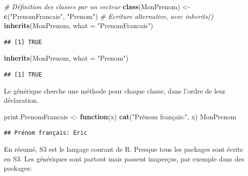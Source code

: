 \documentclass[
  12pt,
  french,
  a4paper,
  extrafontsizes,onecolumn,openright
  ]{memoir}
\newenvironment{Shaded}{\begin{snugshade}}{\end{snugshade}}
\newcommand{\CommentTok}[1]{\textcolor[rgb]{0.56,0.35,0.01}{\textit{#1}}}
\newcommand{\ControlFlowTok}[1]{\textcolor[rgb]{0.13,0.29,0.53}{\textbf{#1}}}
\newcommand{\DataTypeTok}[1]{\textcolor[rgb]{0.13,0.29,0.53}{#1}}
\newcommand{\KeywordTok}[1]{\textcolor[rgb]{0.13,0.29,0.53}{\textbf{#1}}}
\newcommand{\NormalTok}[1]{#1}
\newcommand{\StringTok}[1]{\textcolor[rgb]{0.31,0.60,0.02}{#1}}
\begin{document}
\scriptsize

\begin{Shaded}
\begin{Highlighting}[]
\CommentTok{# Définition des classes par un vecteur}
\KeywordTok{class}\NormalTok{(MonPrenom) <-}\StringTok{ }\KeywordTok{c}\NormalTok{(}\StringTok{"PrenomFrancais"}\NormalTok{, }\StringTok{"Prenom"}\NormalTok{)}
\CommentTok{# Ecriture alternative, avec inherits()}
\KeywordTok{inherits}\NormalTok{(MonPrenom, }\DataTypeTok{what =} \StringTok{"PrenomFrancais"}\NormalTok{)}
\end{Highlighting}
\end{Shaded}

\begin{verbatim}
## [1] TRUE
\end{verbatim}

\begin{Shaded}
\begin{Highlighting}[]
\KeywordTok{inherits}\NormalTok{(MonPrenom, }\DataTypeTok{what =} \StringTok{"Prenom"}\NormalTok{)}
\end{Highlighting}
\end{Shaded}

\begin{verbatim}
## [1] TRUE
\end{verbatim}

\normalsize

Le générique cherche une méthode pour chaque classe, dans l'ordre de leur déclaration.

\scriptsize

\begin{Shaded}
\begin{Highlighting}[]
\NormalTok{print.PrenomFrancais <-}\StringTok{ }\ControlFlowTok{function}\NormalTok{(x) }\KeywordTok{cat}\NormalTok{(}\StringTok{"Prénom français:"}\NormalTok{, }
\NormalTok{    x)}
\NormalTok{MonPrenom}
\end{Highlighting}
\end{Shaded}

\begin{verbatim}
## Prénom français: Eric
\end{verbatim}

\normalsize

En résumé, S3 est le langage courant de R.
Presque tous les packages sont écrits en S3.
Les génériques sont partout mais passent inaperçus, par exemple dans des packages:

\scriptsize
\end{document}
